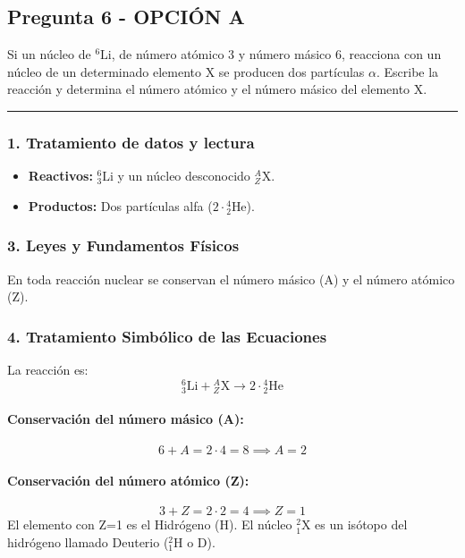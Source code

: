 \subsection{Pregunta 6 - OPCIÓN A}
\label{subsec:6A_2004_jun_ord}

\begin{cajaenunciado}
Si un núcleo de ${}^6\text{Li}$, de número atómico 3 y número másico 6, reacciona con un núcleo de un determinado elemento X se producen dos partículas $\alpha$. Escribe la reacción y determina el número atómico y el número másico del elemento X.
\end{cajaenunciado}
\hrule

\subsubsection*{1. Tratamiento de datos y lectura}
\begin{itemize}
    \item \textbf{Reactivos:} ${}^6_3\text{Li}$ y un núcleo desconocido ${}^A_Z\text{X}$.
    \item \textbf{Productos:} Dos partículas alfa ($2 \cdot {}^4_2\text{He}$).
\end{itemize}

\subsubsection*{3. Leyes y Fundamentos Físicos}
En toda reacción nuclear se conservan el número másico (A) y el número atómico (Z).

\subsubsection*{4. Tratamiento Simbólico de las Ecuaciones}
La reacción es:
$${}^6_3\text{Li} + {}^A_Z\text{X} \longrightarrow 2 \cdot {}^4_2\text{He}$$
\paragraph*{Conservación del número másico (A):}
$$6 + A = 2 \cdot 4 = 8 \implies A = 2$$
\paragraph*{Conservación del número atómico (Z):}
$$3 + Z = 2 \cdot 2 = 4 \implies Z = 1$$
El elemento con Z=1 es el Hidrógeno (H). El núcleo ${}^2_1\text{X}$ es un isótopo del hidrógeno llamado Deuterio (${}^2_1\text{H}$ o D).

